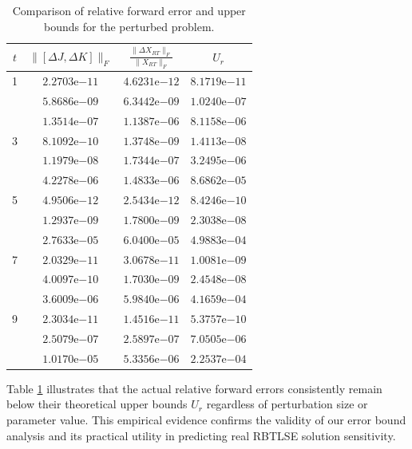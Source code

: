 \documentclass[preprint,11pt,3p]{elsarticle}
\begin{document}
\begin{table}[h]
	\centering
	\small
	\begin{tabular}{c@{\hskip 1.2cm}c@{\hskip 1.2cm}c@{\hskip 1.2cm}c}
		\toprule
		$t$ & $\|[\Delta J, \Delta K]\|_F$ & $\frac{\|\Delta X_{RT}\|_F}{\|X_{RT}\|_F}$ & $U_r$ \\
		\midrule
		1  & $2.2703\text{e}{-11}$ & $4.6231\text{e}{-12}$ & $8.1719\text{e}{-11}$ \\
		& $5.8686\text{e}{-09}$ & $6.3442\text{e}{-09}$ & $1.0240\text{e}{-07}$ \\
		& $1.3514\text{e}{-07}$ & $1.1387\text{e}{-06}$ & $8.1158\text{e}{-06}$ \\
		\midrule
		3  & $8.1092\text{e}{-10}$ & $1.3748\text{e}{-09}$ & $1.4113\text{e}{-08}$ \\
		& $1.1979\text{e}{-08}$ & $1.7344\text{e}{-07}$ & $3.2495\text{e}{-06}$ \\
		& $4.2278\text{e}{-06}$ & $1.4833\text{e}{-06}$ & $8.6862\text{e}{-05}$ \\
		\midrule
		5  & $4.9506\text{e}{-12}$ & $2.5434\text{e}{-12}$ & $8.4246\text{e}{-10}$ \\
		& $1.2937\text{e}{-09}$ & $1.7800\text{e}{-09}$ & $2.3038\text{e}{-08}$ \\
		& $2.7633\text{e}{-05}$ & $6.0400\text{e}{-05}$ & $4.9883\text{e}{-04}$ \\
		\midrule
		7  & $2.0329\text{e}{-11}$ & $3.0678\text{e}{-11}$ & $1.0081\text{e}{-09}$ \\
		& $4.0097\text{e}{-10}$ & $1.7030\text{e}{-09}$ & $2.4548\text{e}{-08}$ \\
		& $3.6009\text{e}{-06}$ & $5.9840\text{e}{-06}$ & $4.1659\text{e}{-04}$ \\
		\midrule
		9  & $2.3034\text{e}{-11}$ & $1.4516\text{e}{-11}$ & $5.3757\text{e}{-10}$ \\
		& $2.5079\text{e}{-07}$ & $2.5897\text{e}{-07}$ & $7.0505\text{e}{-06}$ \\
		& $1.0170\text{e}{-05}$ & $5.3356\text{e}{-06}$ & $2.2537\text{e}{-04}$ \\
		\bottomrule
	\end{tabular}
	\caption{Comparison of relative forward error and upper bounds for the perturbed problem.}
	\label{tab2.1}
\end{table}
Table \ref{tab2.1} illustrates that the actual relative forward errors consistently remain below their theoretical upper bounds $U_r$ regardless of perturbation size or parameter value. This empirical evidence confirms the validity of our error bound analysis and its practical utility in predicting real RBTLSE solution sensitivity. 
\end{document}
